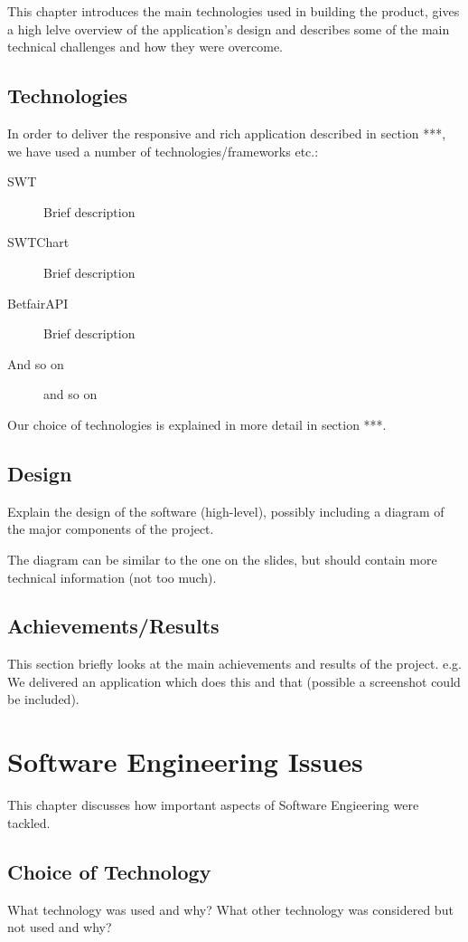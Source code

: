 \documentclass[10pt]{report}
\begin{document}
This chapter introduces the main technologies used in building the product, gives a high lelve overview of the application's design and describes some of the main technical challenges and how they were overcome.

\section{Technologies}
In order to deliver the responsive and rich application described in section ***, we have used a number of technologies/frameworks etc.:
\begin{description}
\item[SWT] Brief description
\item[SWTChart] Brief description 
\item[BetfairAPI] Brief description
\item[And so on] and so on
\end{description}

Our choice of technologies is explained in more detail in section ***.

\section{Design}
Explain the design of the software (high-level), possibly including a diagram of the major components of the project.

The diagram can be similar to the one on the slides, but should contain more technical information (not too much).

\section{Achievements/Results}
This section briefly looks at the main achievements and results of the project.
e.g. We delivered an application which does this and that (possible a screenshot could be included).

\chapter{Software Engineering Issues}

This chapter discusses how important aspects of Software Engieering were tackled.

\section{Choice of Technology}
What technology was used and why? What other technology was considered but not used and why?
\end{document}
